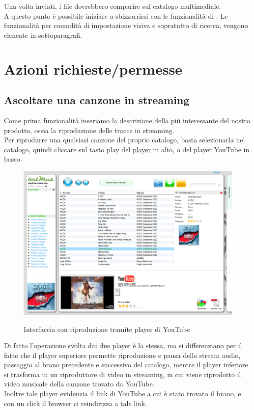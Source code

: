 Una volta inviati, i file dovrebbero comparire sul catalogo multimediale.\\
A questo punto \`e possibile iniziare a sbizzarrirsi con le funzionalit\`a di
. Le funzionalit\`a per comodit\`a di impostazione visiva e
sopratutto di ricerca, vengono elencate in sottoparagrafi.

\section{Azioni richieste/permesse}

\subsection*{Ascoltare una canzone in streaming}

Come prima funzionalit\`a inseriamo la descrizione della pi\`u interessante
del nostro prodotto, ossia la riproduzione delle tracce in streaming.\\ Per
riprodurre una qualsiasi canzone del proprio catalogo, basta selezionarla nel
catalogo, quindi cliccare sul tasto play del \underline{player} in alto, o del
player YouTube in basso.\\
\begin{figure}[htbp]
  \centering
  \includegraphics[width=15cm]{img/MU/player_youtube.png}\\
\caption{Interfaccia con riproduzione tramite player di YouTube}
\end{figure} 

Di fatto l'operazione svolta dai due player \`e la stessa, ma
si differenziano per il fatto che il player superiore permette riproduzione e
pausa dello stream audio, passaggio al brano precedente e successivo del catalogo, mentre il player
inferiore si trasforma in un riproduttore di video in streaming, in cui viene
riprodotto il video musicale della canzone trovato da YouTube.\\
Inoltre tale player evidenzia il link di YouTube a cui \`e stato trovato il
brano, e con un click il browser ci reindirizza a tale link.

